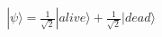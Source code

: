\documentclass[preview]{standalone}
\begin{document}
\begin{align*}
|\psi\rangle = \frac{1}{\sqrt{2}}|alive\rangle + \frac{1}{\sqrt{2}}|dead\rangle
\end{align*}
\end{document}
